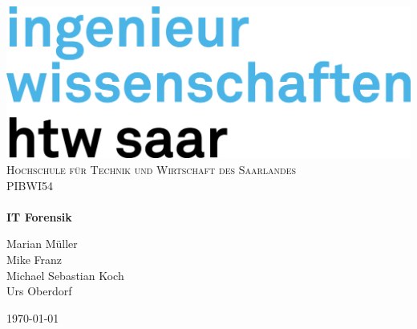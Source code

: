 \begin{titlepage}
\begin{center}

\includegraphics[scale=1]{graphics/htw_Logo_inwi_CO.png}\\[1cm]

\textsc{\LARGE Hochschule für Technik und Wirtschaft des Saarlandes}\\[1.5cm]

\textsc{\Large PIBWI54}\\[0.5cm]
\hrulefill \\[0.4cm]
{ \huge \bfseries IT Forensik \\[0.4cm] }

\hrulefill
\noindent


Marian Müller \\
Mike Franz \\
Michael Sebastian Koch \\
Urs Oberdorf \\


\vfill
\begin{center}
{\large \today}
\end{center}
\end{center}
\end{titlepage}